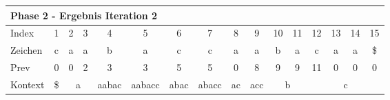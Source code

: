 \begin{table}[H]
\caption[Konstruktion des Suffix Arrays f{\"u}r das Wort caabaccaabacaa: Phase 2, Iteration 1]{Konstruktion des Suffix Arrays f{\"u}r das Wort caabaccaabacaa: Phase 2, Iteration 1. Betrachteter Index: 1, enthaltener Wert: 15, Vorg{\"a}ngerelement: 14, \prevpointer-Kette: 0. Element 14 wird in SA aufgenommen.}
\label{table_complex_example_2_1} 
\end{table}

\begin{table}[H]
\centering
\begin{adjustbox}{max width=\textwidth}
\centering
\begin{tabular}{lccccccccccccccc}
\multicolumn{16}{l}{Phase 2 - Ergebnis Iteration 2}                                                                                                                                                                                                                                                                                                                   \\ \hline
\multicolumn{1}{l|}{Index}   & 1                       & 2                          & 3                                               & 4                          & 5                           & 6                         & 7                          & 8                       & 9                        & 10 & 11                      & 12  & 13  & 14  & 15  \\
\multicolumn{1}{l|}{Zeichen} & c                       & a                          & a                                               & b                          & a                           & c                         & c                          & a                       & a                        & b  & a                       & c   & a   & a   & \$  \\
\multicolumn{1}{l|}{Prev}    & 0                       & 0                          & 2                                               & 3                          & 3                           & 5                         & 5                          & 0                       & 8                        & 9  & 9                       & 11  & 0   & 0   & 0   \\ \hline
\multicolumn{1}{l|}{Kontext} & \multicolumn{1}{c|}{\$} & \multicolumn{2}{c|}{a}                                                       & \multicolumn{1}{c|}{aabac} & \multicolumn{1}{c|}{aabacc} & \multicolumn{1}{c|}{abac} & \multicolumn{1}{c|}{abacc} & \multicolumn{1}{c|}{ac} & \multicolumn{1}{c|}{acc} & \multicolumn{2}{c|}{b}       & \multicolumn{4}{c}{c} \\

\end{tabular}
\end{adjustbox}
\end{table}
